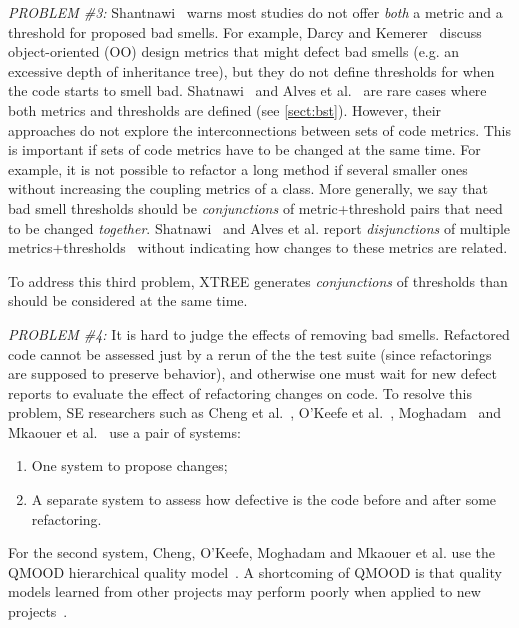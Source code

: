 \documentclass{sig-alternate}
\newcommand{\tion}[1]{\textsection\ref{sect:#1}}
\theoremstyle{break}
\begin{document}
{\em PROBLEM \#3:}  
Shantnawi~\cite{Shatnawi10} warns most  studies do not offer
{\em both} a metric and a threshold for proposed bad smells. For example,  Darcy and Kemerer~\cite{darcy05}
discuss object-oriented (OO) design metrics that might defect bad smells (e.g. an excessive
depth of inheritance tree), but they do not define thresholds
for when the code starts to smell bad.  
Shatnawi~\cite{Shatnawi10}
and  Alves et al.~\cite{Alves2010} are rare cases where both metrics and thresholds are defined (see \tion{bst}).
However, their approaches do not explore the interconnections between sets of code metrics. This is important if sets of
code metrics have to be changed at the same time.
For example, it is not possible to refactor a
long method if several smaller ones without increasing
the coupling metrics of a class. 
More generally, we say that bad smell thresholds should be
{\em conjunctions} of metric+threshold pairs that need to be changed {\em together}.
Shatnawi~\cite{Shatnawi10}
and Alves et al. report {\em disjunctions} of multiple metrics+thresholds~\cite{Shatnawi10,Alves2010} without indicating how changes to these metrics are related.



To address this third problem, 
XTREE   generates {\em conjunctions} of   thresholds
than should  be considered at the same time.

 
{\em PROBLEM \#4:} It is hard to judge the  effects of removing bad smells.
Refactored code cannot be assessed just by a rerun of the the test
suite (since refactorings are supposed to preserve behavior), and otherwise one must wait for new defect reports to evaluate the effect of refactoring changes on code.  
To resolve this  problem, SE researchers such as 
Cheng et al.~\cite{Cheng10}, O'Keefe et al.~\cite{OKeeffe08,OKeeffe07},
Moghadam~\cite{Moghadam2011} and Mkaouer et al.~\cite{Mkaouer14}
use a pair of systems: 
\begin{enumerate}
    \item One system to propose changes;
\item A separate system to assess
how defective is the code before and after some
refactoring.
\end{enumerate}
For the second system,
 Cheng, O'Keefe, Moghadam and  Mkaouer et al. use the QMOOD hierarchical
quality model~\cite{Bansiya02}.
A shortcoming of QMOOD
is that quality models learned from other projects
may perform poorly when applied to new projects~\cite{localvsglobal}.
\end{document}
